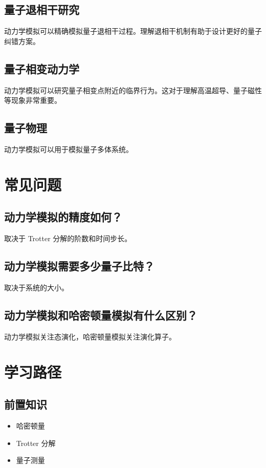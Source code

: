 \documentclass[12pt,a4paper]{article}
\begin{document}
\subsection{量子退相干研究}

动力学模拟可以精确模拟量子退相干过程。理解退相干机制有助于设计更好的量子纠错方案。

\subsection{量子相变动力学}

动力学模拟可以研究量子相变点附近的临界行为。这对于理解高温超导、量子磁性等现象非常重要。

\subsection{量子物理}

动力学模拟可以用于模拟量子多体系统。

\section{常见问题}

\subsection{动力学模拟的精度如何？}

取决于 Trotter 分解的阶数和时间步长。

\subsection{动力学模拟需要多少量子比特？}

取决于系统的大小。

\subsection{动力学模拟和哈密顿量模拟有什么区别？}

动力学模拟关注态演化，哈密顿量模拟关注演化算子。

\section{学习路径}

\subsection{前置知识}
\begin{itemize}
  \item 哈密顿量
  \item Trotter 分解
  \item 量子测量
\end{itemize}
\end{document}
